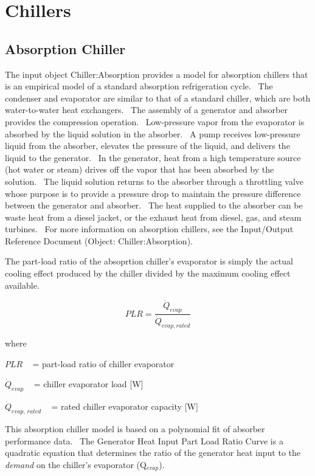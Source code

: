 \section{Chillers }\label{chillers}

\subsection{Absorption Chiller}\label{absorption-chiller}

The input object Chiller:Absorption provides a model for absorption chillers that is an empirical model of a standard absorption refrigeration cycle.~ The condenser and evaporator are similar to that of a standard chiller, which are both water-to-water heat exchangers.~ The assembly of a generator and absorber provides the compression operation.~ Low-pressure vapor from the evaporator is absorbed by the liquid solution in the absorber.~ A pump receives low-pressure liquid from the absorber, elevates the pressure of the liquid, and delivers the liquid to the generator.~ In the generator, heat from a high temperature source (hot water or steam) drives off the vapor that has been absorbed by the solution.~ The liquid solution returns to the absorber through a throttling valve whose purpose is to provide a pressure drop to maintain the pressure difference between the generator and absorber.~ The heat supplied to the absorber can be waste heat from a diesel jacket, or the exhaust heat from diesel, gas, and steam turbines.~ For more information on absorption chillers, see the Input/Output Reference Document (Object: Chiller:Absorption).

The part-load ratio of the absoprtion chiller's evaporator is simply the actual cooling effect produced by the chiller divided by the maximum cooling effect available.

\begin{equation}
PLR = \frac{\dot{Q}_{evap}}{\dot{Q}_{evap,rated}}
\end{equation}

where

\(PLR\) ~ = part-load ratio of chiller evaporator

\({\dot Q_{evap}}\) ~ = chiller evaporator load {[}W{]}

\({\dot Q_{evap,\,rated}}\) ~ = rated chiller evaporator capacity {[}W{]}

This absorption chiller model is based on a polynomial fit of absorber performance data.~ The Generator Heat Input Part Load Ratio Curve is a quadratic equation that determines the ratio of the generator heat input to the \emph{demand} on the chiller's evaporator (Q\(_{evap}\)).

